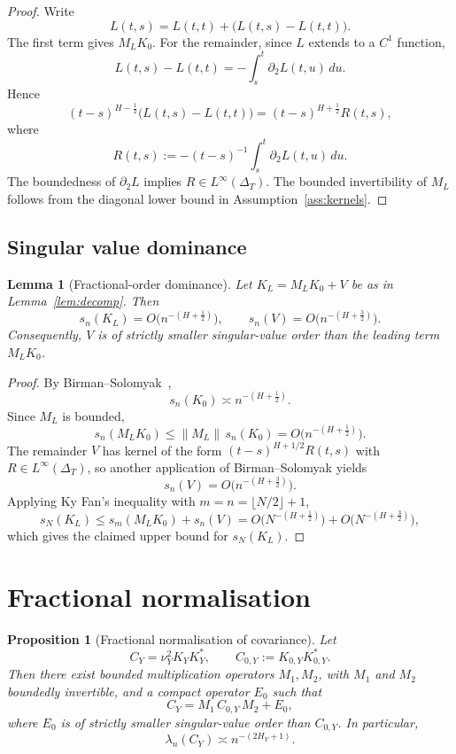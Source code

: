 \documentclass[11pt,a4paper]{amsart}
\theoremstyle{plain}
\newtheorem{lemma}[theorem]{Lemma}
\newtheorem{proposition}[theorem]{Proposition}
\theoremstyle{definition}
\theoremstyle{remark}
\begin{document}
\begin{proof}
Write
\[
L(t,s)=L(t,t)+\bigl(L(t,s)-L(t,t)\bigr).
\]
The first term gives $M_LK_0$. For the remainder, since $L$ extends to a $C^1$ function,
\[
L(t,s)-L(t,t)=-\int_s^t \partial_2L(t,u)\,du.
\]
Hence
\[
(t-s)^{H-\frac12}\bigl(L(t,s)-L(t,t)\bigr)
=(t-s)^{H+\frac12}R(t,s),
\]
where
\[
R(t,s):=-(t-s)^{-1}\int_s^t \partial_2L(t,u)\,du.
\]
The boundedness of $\partial_2L$ implies $R\in L^\infty(\Delta_T)$. The bounded invertibility of $M_L$ follows from the diagonal lower bound in Assumption~\ref{ass:kernels}.
\end{proof}

\subsection{Singular value dominance}

\begin{lemma}[Fractional-order dominance]\label{lem:svdom}
Let $K_L=M_LK_0+V$ be as in Lemma~\ref{lem:decomp}. Then
\[
s_n(K_L)=O\bigl(n^{-(H+\frac12)}\bigr),
\qquad
s_n(V)=O\bigl(n^{-(H+\frac32)}\bigr).
\]
Consequently, $V$ is of strictly smaller singular-value order than the leading term $M_LK_0$.
\end{lemma}

\begin{proof}
By Birman--Solomyak~\cite{BS77},
\[
s_n(K_0)\asymp n^{-(H+\frac12)}.
\]
Since $M_L$ is bounded,
\[
s_n(M_LK_0)\le \|M_L\|\,s_n(K_0)=O\bigl(n^{-(H+\frac12)}\bigr).
\]
The remainder $V$ has kernel of the form $(t-s)^{H+1/2}R(t,s)$ with $R\in L^\infty(\Delta_T)$, so another application of Birman--Solomyak yields
\[
s_n(V)=O\bigl(n^{-(H+\frac32)}\bigr).
\]
Applying Ky Fan's inequality with \(m=n=\lfloor N/2\rfloor+1\),
\[
s_N(K_L)\le s_m(M_LK_0)+s_n(V)
=
O\bigl(N^{-(H+\frac12)}\bigr)+O\bigl(N^{-(H+\frac32)}\bigr),
\]
which gives the claimed upper bound for \(s_N(K_L)\).
\end{proof}

\section{Fractional normalisation}\label{sec:fracnorm}

\begin{proposition}[Fractional normalisation of covariance]\label{prop:fracnorm}
Let
\[
C_Y=\nu_Y^2K_YK_Y^*,
\qquad
C_{0,Y}:=K_{0,Y}K_{0,Y}^*.
\]
Then there exist bounded multiplication operators $M_1,M_2$, with $M_1$ and $M_2$ boundedly invertible, and a compact operator $E_0$ such that
\[
C_Y=M_1\,C_{0,Y}\,M_2+E_0,
\]
where $E_0$ is of strictly smaller singular-value order than $C_{0,Y}$. In particular,
\[
\lambda_n(C_Y)\asymp n^{-(2H_Y+1)}.
\]
\end{proposition}
\end{document}
